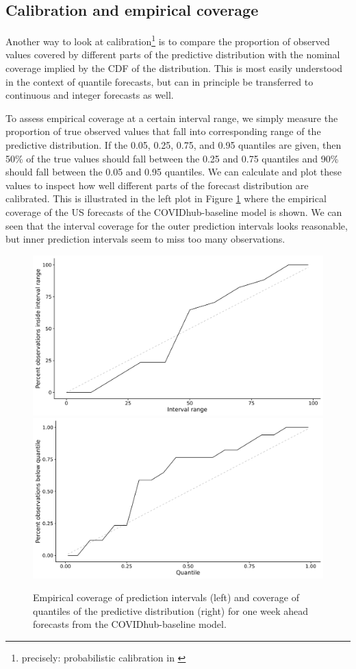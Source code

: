 \documentclass[
]{book}
\begin{document}
\hypertarget{calibration-and-empirical-coverage}{%
\subsection{Calibration and empirical coverage}\label{calibration-and-empirical-coverage}}

Another way to look at calibration\footnote{precisely: probabilistic calibration in \citet{gneitingProbabilisticForecastsCalibration2007}} is to compare the proportion of observed values covered by different parts of the predictive distribution with the nominal coverage implied by the CDF of the distribution. This is most easily understood in the context of quantile forecasts, but can in principle be transferred to continuous and integer forecasts as well.

To assess empirical coverage at a certain interval range, we simply measure the proportion of true observed values that fall into corresponding range of the predictive distribution. If the 0.05, 0.25, 0.75, and 0.95 quantiles are given, then 50\% of the true values should fall between the 0.25 and 0.75 quantiles and 90\% should fall between the 0.05 and 0.95 quantiles. We can calculate and plot these values to inspect how well different parts of the forecast distribution are calibrated. This is illustrated in the left plot in Figure \ref{fig:coverage} where the empirical coverage of the US forecasts of the COVIDhub-baseline model is shown. We can seen that the interval coverage for the outer prediction intervals looks reasonable, but inner prediction intervals seem to miss too many observations.

\begin{figure}
\includegraphics[width=0.5\linewidth]{../visualisation/chapter-3-evaluation/interval-coverage} \includegraphics[width=0.5\linewidth]{../visualisation/chapter-3-evaluation/quantile-coverage} \caption{Empirical coverage of prediction intervals (left) and coverage of quantiles of the predictive distribution (right) for one week ahead forecasts from the COVIDhub-baseline model.}\label{fig:coverage}
\end{figure}
\end{document}
